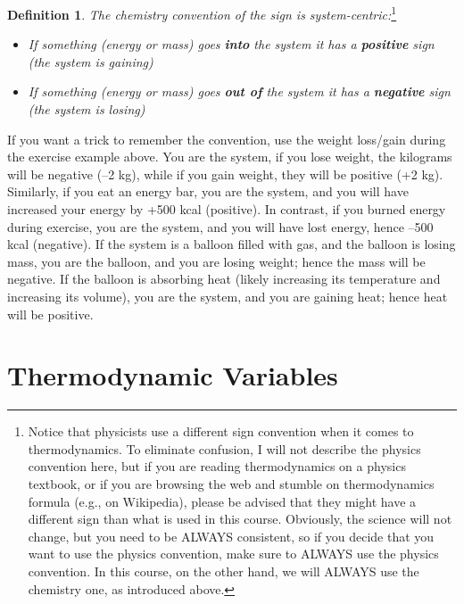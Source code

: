 \documentclass[
]{book}
\providecommand{\tightlist}{%
  \setlength{\itemsep}{0pt}\setlength{\parskip}{0pt}}
\theoremstyle{definition}
\newtheorem{definition}{Definition}[chapter]
\theoremstyle{definition}
\theoremstyle{definition}
\theoremstyle{remark}
\begin{document}
\begin{definition}
\protect\hypertarget{def:chemistryconv}{}{\label{def:chemistryconv} }\emph{The chemistry convention of the sign is system-centric:}\footnote{Notice that physicists use a different sign convention when it comes to thermodynamics. To eliminate confusion, I will not describe the physics convention here, but if you are reading thermodynamics on a physics textbook, or if you are browsing the web and stumble on thermodynamics formula (e.g., on Wikipedia), please be advised that they might have a different sign than what is used in this course. Obviously, the science will not change, but you need to be ALWAYS consistent, so if you decide that you want to use the physics convention, make sure to ALWAYS use the physics convention. In this course, on the other hand, we will ALWAYS use the chemistry one, as introduced above.}
\end{definition}

\begin{itemize}
\tightlist
\item
  \emph{If something (energy or mass) goes \textbf{into} the system it has a \textbf{positive} sign (the system is gaining)}
\item
  \emph{If something (energy or mass) goes \textbf{out of} the system it has a \textbf{negative} sign (the system is losing)}
\end{itemize}

If you want a trick to remember the convention, use the weight loss/gain during the exercise example above. You are the system, if you lose weight, the kilograms will be negative (--2 kg), while if you gain weight, they will be positive (+2 kg). Similarly, if you eat an energy bar, you are the system, and you will have increased your energy by +500 kcal (positive). In contrast, if you burned energy during exercise, you are the system, and you will have lost energy, hence --500 kcal (negative). If the system is a balloon filled with gas, and the balloon is losing mass, you are the balloon, and you are losing weight; hence the mass will be negative. If the balloon is absorbing heat (likely increasing its temperature and increasing its volume), you are the system, and you are gaining heat; hence heat will be positive.

\hypertarget{thermodynamic-variables}{%
\section{Thermodynamic Variables}\label{thermodynamic-variables}}
\end{document}
